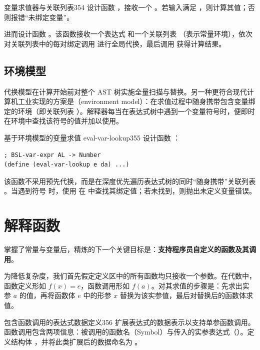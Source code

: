 \begin{exercise}{变量求值器与关联列表}{354}
设计函数 ，接收一个 。若输入满足 ，则计算其值；否则报错“未绑定变量”。

进而设计函数 。该函数接收一个表达式  和一个关联列表 （表示常量环境），依次对关联列表中的每对绑定调用  进行全局代换，最后调用  获得计算结果。
\end{exercise}

\subsection{环境模型 }

代换模型在计算开始前对整个 AST 树实施全量扫描与替换。另一种更符合现代计算机工业实现的方案是（environment model）：在求值过程中随身携带包含变量绑定的环境（即关联列表 ）。解释器每当在表达式树中遇到一个变量符号时，便即时在环境中查找该符号的值并加以使用。

\begin{exercise}{基于环境模型的变量求值 eval-var-lookup}{355}
设计函数 ：
\begin{lstlisting}[language=BSL]
; BSL-var-expr AL -> Number
(define (eval-var-lookup e da) ...)
\end{lstlisting}
该函数不采用预先代换，而是在深度优先遍历表达式树的同时“随身携带”关联列表 。当遇到符号  时，使用  在  中查找其绑定值；若未找到，则抛出未定义变量错误。
\end{exercise}

\section{解释函数 }
\label{sec:21.3_eval_functions}

掌握了常量与变量后，精炼的下一个关键目标是：\textbf{支持程序员自定义的函数及其调用}。

为降低复杂度，我们首先假定定义区中的所有函数均只接收一个参数。在代数中，函数定义形如 $f(x) = e$，函数调用形如 $f(a)$。对其求值的步骤是：先求出实参 $a$ 的值，再将函数体 $e$ 中的形参 $x$ 替换为该实参值，最后对替换后的函数体求值。

\begin{exercise}{包含函数调用的表达式数据定义}{356}
扩展表达式的数据表示以支持单参函数调用。函数调用包含两项信息：被调用的函数名（Symbol）与传入的实参表达式（）。定义结构体 ，并将此类扩展后的数据命名为 。
\end{exercise}

